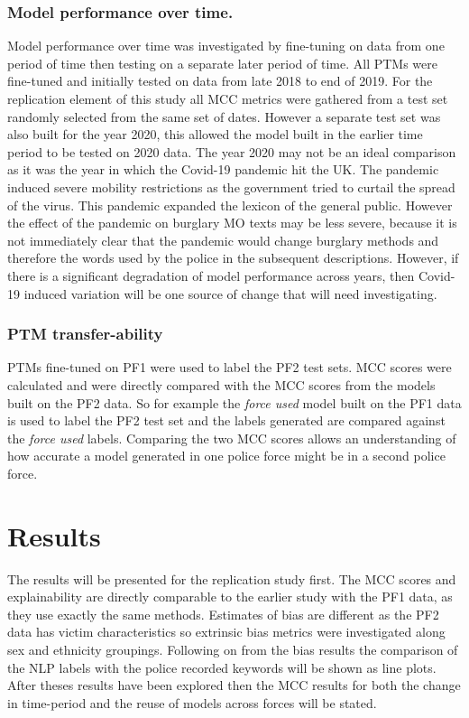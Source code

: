 \subsubsection{Model performance over time.} Model performance over time was investigated by fine-tuning on data from one period of time then testing on a separate later period of time. All PTMs were fine-tuned and initially tested on data from late 2018 to end of 2019. For the replication element of this study all MCC metrics were gathered from a test set randomly selected from the same set of dates. However a separate test set was also built for the year 2020, this allowed the model built in the earlier time period to be tested on 2020 data. The year 2020 may not be an ideal comparison as it  was the year in which the Covid-19 pandemic hit the UK.  The pandemic induced severe mobility restrictions as the government tried to curtail the spread of the virus. This pandemic expanded the lexicon of the general public. However the effect of the pandemic on burglary MO texts may be less severe, because it is not immediately clear that the pandemic would change burglary methods and therefore the words used by the police in the subsequent descriptions. However, if there is a significant degradation of model performance across years, then Covid-19 induced variation will be one source of change that will need investigating.     

\subsubsection{PTM transfer-ability} PTMs fine-tuned on PF1 were used to label the PF2 test sets. MCC scores were calculated and were directly compared with the MCC scores from the models built on the PF2 data. So for example the \emph{force used} model built on the PF1 data is used to label the PF2 test set and the labels generated are compared against the \emph{force used} labels. Comparing the two MCC scores allows an understanding of how accurate a model generated in one police force might be in a second police force. 

\section{Results} The results will be presented for the replication study first. The MCC scores and explainability are directly comparable to the earlier study with the PF1 data, as they use exactly the same methods. Estimates of bias are different as the PF2 data has victim characteristics so extrinsic bias metrics were investigated along sex and ethnicity groupings. Following on from the bias results the comparison of the NLP labels with the police recorded keywords will be shown as line plots. After theses results have been explored then the MCC results for both the change in time-period and the reuse of models across forces will be stated.

